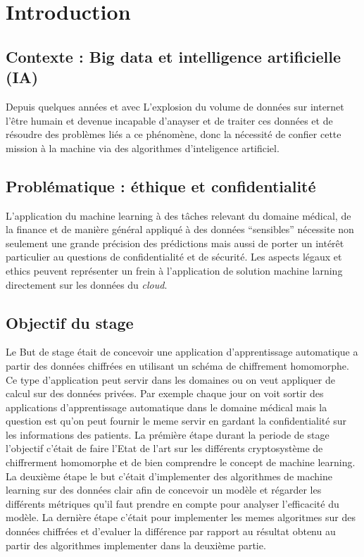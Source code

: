 \documentclass[a4paper,12pt]{article}
\begin{document}
\newpage
\section{Introduction}
\subsection{Contexte : Big data et intelligence artificielle (IA)}
Depuis quelques années  et avec L'explosion du volume de données sur internet l'être humain et devenue incapable d'anayser et de traiter ces données et de résoudre des problèmes liés a ce phénomène, donc la nécessité de confier cette mission à la machine via des algorithmes d'inteligence artificiel.     
\subsection{Problématique : éthique et confidentialité}
L'application du machine learning à des tâches relevant du domaine  médical, de la finance et de manière général appliqué à des données ``sensibles'' nécessite non seulement une grande précision des prédictions mais aussi de porter un intérêt particulier au questions de confidentialité et de sécurité. Les aspects légaux et ethics peuvent représenter un frein à l'application de solution machine larning directement sur les données du \textit{cloud}.\\
\subsection{Objectif du stage}
Le But de  stage était de concevoir une application d'apprentissage automatique a partir des données chiffrées en utilisant un schéma de chiffrement homomorphe.\newline
Ce type d'application peut servir dans les domaines ou on veut appliquer de calcul sur des données privées.\newline
Par exemple chaque jour on voit sortir des applications d'apprentissage automatique dans le domaine médical mais la question est qu'on peut fournir le meme servir en gardant la confidentialité sur les informations des patients.\newline
La prémière étape durant la periode de stage l'objectif c'était de faire l'Etat de l'art sur les différents cryptosystème de chiffrerment homomorphe et de bien comprendre le concept de machine learning.\newline
La deuxième étape le but c'était d'implementer des algorithmes de machine learning sur des données clair afin de concevoir un modèle et régarder les différents métriques qu'il faut prendre en compte pour analyser l'efficacité du modèle.\newline
La dernière étape c'était pour implementer les memes algoritmes sur des données chiffrées et d'evaluer la différence par rapport au résultat obtenu au partir des algorithmes implementer dans la deuxième partie.\newline
\end{document}
